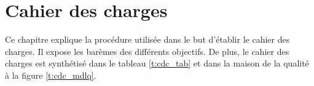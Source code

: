 

\chapter{Cahier des charges}
\label{s:cdc}

Ce chapitre explique la procédure utilisée dans le but d'établir le cahier des charges.
Il expose les barèmes des différents objectifs.
De plus, le cahier des charges est synthétisé dans le tableau \ref{t:cdc_tab} et dans la maison de la qualité à la figure \ref{t:cdc_mdlq}.









